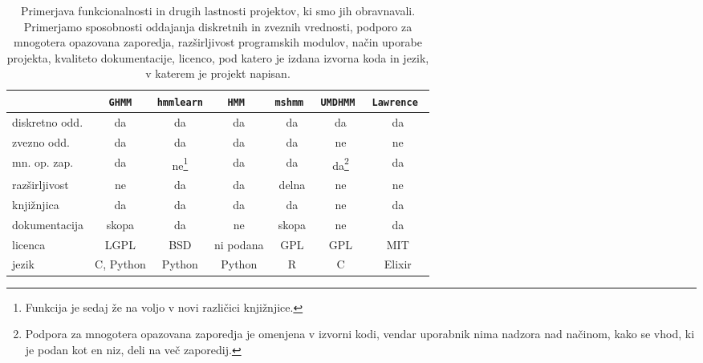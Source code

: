 \begin{table}
\begin{minipage}{\textwidth}
\centering
\small
\begin{tabular}{l|c|c|c|c|c|c}
& {\tt GHMM} & {\tt hmmlearn} & \tt{HMM} & \tt{mshmm} & \tt{UMDHMM} & \tt{Lawrence} \\ \hline
diskretno odd. & da & da & da & da & da & da \\ 
zvezno odd.    & da & da & da & da & ne & ne  \\
mn. op. zap.   & da & ne\footnote{Funkcija je sedaj že na voljo v novi različici knjižnjice.}
                        & da & da & da\footnote{Podpora za mnogotera opazovana zaporedja je omenjena v izvorni kodi, vendar uporabnik nima nadzora nad načinom, kako se vhod, ki je podan kot en niz, deli na več zaporedij.}
                                           & da \\
razširljivost  & ne & da & da & delna & ne & ne \\
knjižnjica  & da & da & da & da & ne & da \\
dokumentacija  & skopa & da & ne & skopa & ne & da \\
licenca        & LGPL & BSD & ni podana & GPL & GPL & MIT \\
jezik          & C, Python & Python & Python & R & C & Elixir \\
\end{tabular}
\caption[Pirmerjava funkcionalnosti projektov]{
  Primerjava funkcionalnosti in drugih lastnosti projektov, ki smo jih
  obravnavali. Primerjamo sposobnosti oddajanja diskretnih in zveznih
  vrednosti, podporo za mnogotera opazovana zaporedja, razširljivost
  programskih modulov, način uporabe projekta, kvaliteto dokumentacije,
  licenco, pod katero je izdana izvorna koda in jezik, v katerem je projekt
  napisan.}
\label{tab:compare}
\end{minipage}
\end{table}
